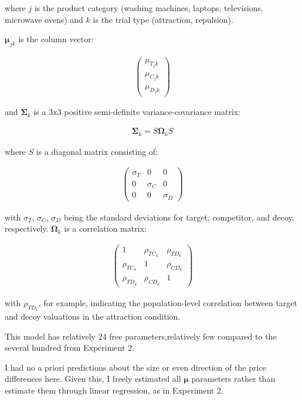 where $j$ is the product category (washing machines, laptops, televisions, microwave ovens) and $k$ is the trial type (attraction, repulsion). 

$\boldsymbol{\mu}_{jk}$ is the column vector:

\begin{align}
   \begin{pmatrix}
      \mu_{T_jk} \\
      \mu_{C_jk} \\
      \mu_{D_jk}
      \end{pmatrix}
   \label{eqn:mu_price}
\end{align}

and $\boldsymbol{\Sigma}_{k}$ is a $3\text{x}3$ positive semi-definite variance-covariance matrix:

\begin{align}
   \boldsymbol{\Sigma}_{k}=S\boldsymbol{\Omega}_{k}S
\end{align}

where $S$ is a diagonal matrix consisting of: 

\begin{align}
   \begin{pmatrix}
      \sigma_{T} & 0 & 0 \\
      0 & \sigma_{C} & 0 \\
      0 & 0 & \sigma_{D} 
   \end{pmatrix}
\end{align}

with $\sigma_{T}$, $\sigma_{C}$, $\sigma_{D}$ being the standard deviations for target, competitor, and decoy, respectively. $\boldsymbol{\Omega}_{k}$ is a correlation matrix:

\begin{align}
   \begin{pmatrix}
      1 & \rho_{TC_k} & \rho_{TD_k} \\
      \rho_{TC_k} & 1 & \rho_{CD_k} \\
      \rho_{TD_k} & \rho_{CD_k} & 1 
   \end{pmatrix}
\end{align}

with $\rho_{TD_1}$, for example, indicating the population-level correlation between target and decoy valuations in the attraction condition.

This model has relatively $24$ free parameters,relatively few compared to the several hundred from Experiment 2.

I had no a priori predictions about the size or even direction of the price differences here. Given this, I freely estimated all $\boldsymbol{\mu}$ parameters rather than estimate them through linear regression, as in Experiment 2.

